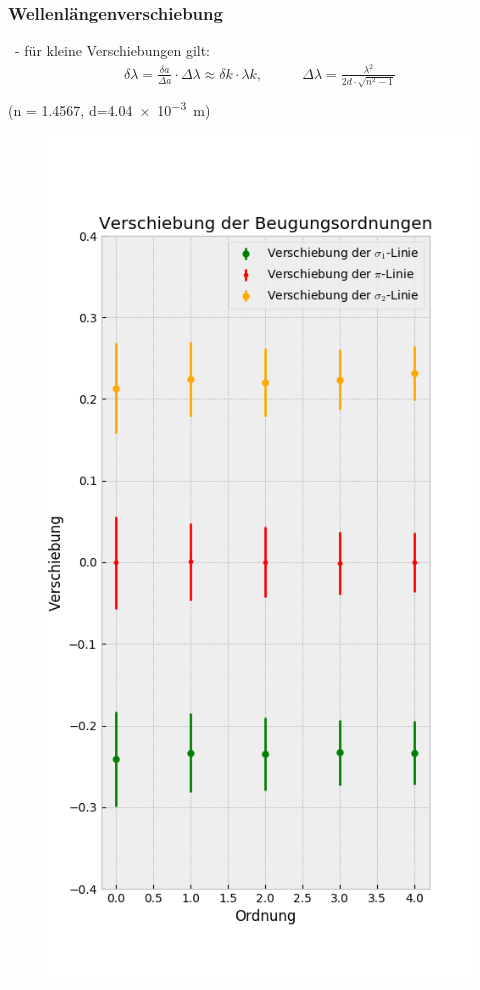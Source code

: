     \subsubsection{Wellenlängenverschiebung}
      \begin{myframe}{\subsecname\ - \subsubsecname}
        für kleine Verschiebungen gilt:
        \begin{align}
          \delta\lambda = \frac{\delta a}{\Delta a}\cdot \Delta\lambda\approx\delta k\cdot\lambda k,
          &\qquad\Delta\lambda = \frac{\lambda^2}{2d\cdot\sqrt{n^2-1}}\\
        \end{align}
        \scriptsize (n = \SI{1.4567}{}, d=\SI{4.04e-3}{m})
      \end{myframe}
      \begin{myframe}{}
          \begin{figure}
              \centering
              \includegraphics[height=.85\paperheight]{img/diff_sco10A}

\end{figure}
\end{myframe}
